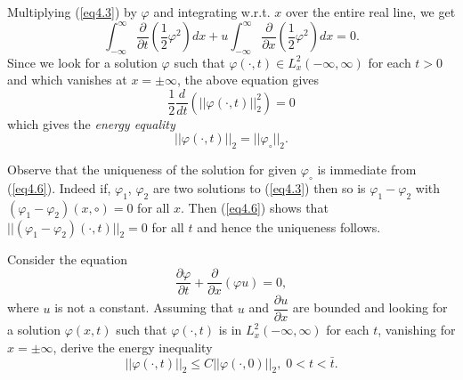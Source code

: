Multiplying (\ref{eq4.3}) by $\varphi$ and integrating w.r.t. $x$ over the
entire real line, we get
\begin{equation*}
\int^\infty_{-\infty} \frac{\partial}{\partial t} \left(\frac{1}{2}
\varphi^2\right) dx + u \int^\infty_{-\infty} \frac{\partial}{\partial x}
\left(\frac{1}{2} \varphi^2\right) dx  =0. \tag{4.4}\label{eq4.4}
\end{equation*}
Since we look for a solution $\varphi$ such that $\varphi( \cdot, t)
\in L^2_x(-\infty, \infty)$ for each $t>0$ and which vanishes at $x =
\pm \infty$, the above equation gives 
\begin{equation*}
\frac{1}{2} \frac{d}{dt} (||\varphi (\cdot, t)||^2_2) = 0 \tag{4.5}\label{eq4.5}
\end{equation*}
which gives the {\em energy equality}
\begin{equation*}
||\varphi (\cdot , t) ||_2 = ||\varphi_\circ||_2.\tag{4.6}\label{eq4.6}
\end{equation*}


Observe that the uniqueness of the solution for given $\varphi_\circ$
is immediate from (\ref{eq4.6}). Indeed if, $\varphi_1$, $\varphi_2$ are two
solutions to (\ref{eq4.3}) then so is $\varphi_1 - \varphi_2$ with $(\varphi_1
- \varphi_2) (x, \circ) = 0$ for all $x$. Then (\ref{eq4.6}) shows that
$||(\varphi_1 - \varphi_2) (\cdot , t)||_2 = 0$ for all $t$ and hence
the uniqueness follows. 

\begin{exercise}\label{chap4:exer4.1}
Consider the equation
$$
\frac{\partial \varphi}{\partial t}+ \frac{\partial}{\partial x}
(\varphi u) = 0,
$$
where $u$ is not a constant. Assuming that $u$ and $\dfrac{\partial
  u}{\partial x}$ are bounded and looking for a solution $\varphi
(x,t)$ such that $\varphi (\cdot , t)$ is in $L^2_x(-\infty, \infty)$
for each $t$, vanishing for\pageoriginale $x = \pm \infty$, derive the
energy inequality
$$
||\varphi (\cdot, t) ||_2 \leq C ||\varphi (\cdot, 0)||_2, \; 0 <
t< \bar{t}. 
$$
\end{exercise}

